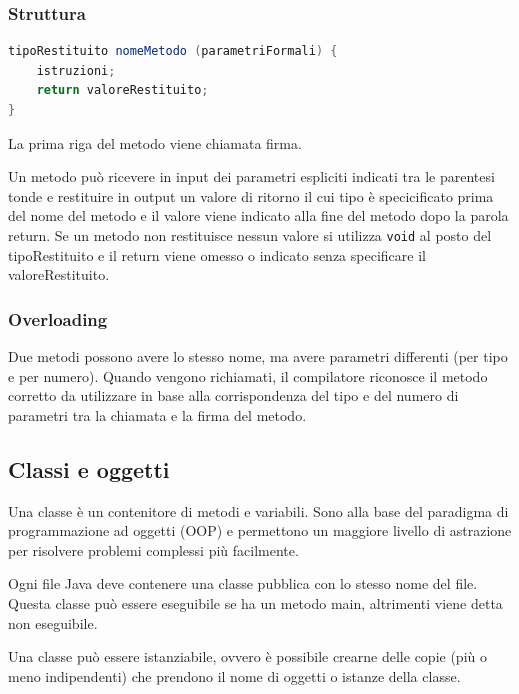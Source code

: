 \documentclass{article}
\begin{document}
\subsubsection*{Struttura}
\begin{lstlisting}[language=Java]
tipoRestituito nomeMetodo (parametriFormali) {
	istruzioni;
	return valoreRestituito;
}
\end{lstlisting}

La prima riga del metodo viene chiamata firma.

Un metodo può ricevere in input dei parametri espliciti indicati tra le parentesi tonde e restituire in output un valore di ritorno
il cui tipo è specicificato prima del nome del metodo e il valore viene indicato alla fine del metodo dopo la parola return.
Se un metodo non restituisce nessun valore si utilizza \verb|void| al posto del tipoRestituito e il return viene omesso o 
indicato senza specificare il valoreRestituito.

\subsubsection*{Overloading}
Due metodi possono avere lo stesso nome, ma avere parametri differenti (per tipo e per numero). Quando vengono richiamati, il
compilatore riconosce il metodo corretto da utilizzare in base alla corrispondenza del tipo e del numero di parametri tra la chiamata
e la firma del metodo.


\subsection{Classi e oggetti}
Una classe è un contenitore di metodi e variabili. Sono alla base del paradigma di programmazione ad oggetti (OOP) e permettono
un maggiore livello di astrazione per risolvere problemi complessi più facilmente.

Ogni file Java deve contenere una classe pubblica con lo stesso nome del file. Questa classe può essere eseguibile se ha un metodo
main, altrimenti viene detta non eseguibile.

Una classe può essere istanziabile, ovvero è possibile crearne delle copie (più o meno indipendenti) che prendono il nome di oggetti
o istanze della classe.
\end{document}
